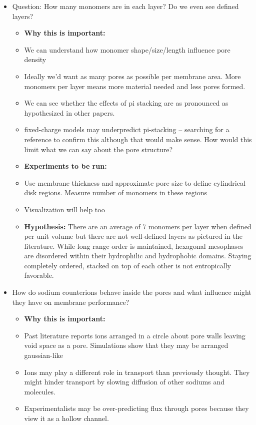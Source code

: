 \documentclass{article}
\begin{document}
	\begin{itemize}
		\item Question: How many monomers are in each layer? Do we even see defined layers?
		\begin{itemize}
			\item \textbf{Why this is important:} 
				\item We can understand how monomer shape/size/length influence pore density
				\item Ideally we'd want as many pores as possible per membrane area. More monomers per layer means more material needed and less pores formed.
				\item We can see whether the effects of pi stacking are as pronounced as hypothesized in other papers.
					\item fixed-charge models may underpredict pi-stacking -- searching for a reference to confirm this although that would make sense. How would this limit what we can say about the pore structure?
			\item \textbf{Experiments to be run:}
				\item Use membrane thickness and approximate pore size to define cylindrical disk regions. Measure number of monomers in these regions
				\item Visualization will help too
			\item \textbf{Hypothesis:} There are an average of 7 monomers per layer when defined per unit volume but there are not well-defined layers as pictured in the literature. While long range order is maintained, hexagonal mesophases are disordered within their hydrophilic and hydrophobic domains. Staying completely ordered, stacked on top of each other is not entropically favorable.
		\end{itemize}
		\item How do sodium counterions behave inside the pores and what influence might they have on membrane performance?
		\begin{itemize}
			\item \textbf{Why this is important:}
			\item Past literature reports ions arranged in a circle about pore walls leaving void space as a pore. Simulations show that they may be arranged gaussian-like	
			\item Ions may play a different role in transport than previously thought. They might hinder transport by slowing diffusion of other sodiums and molecules.
			\item  Experimentalists may be over-predicting flux through pores because they view it as a hollow channel.

\end{itemize}
\end{itemize}
\end{document}

